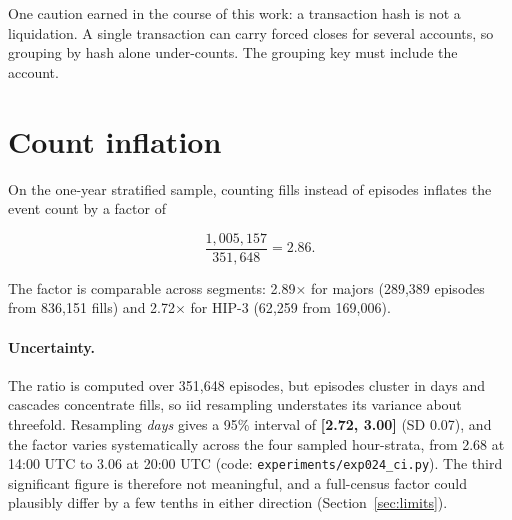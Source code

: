\documentclass[11pt,a4paper]{article}
\begin{document}
One caution earned in the course of this work: a transaction hash is not a liquidation. A single
transaction can carry forced closes for several accounts, so grouping by hash alone
under-counts. The grouping key must include the account.

\section{Count inflation}
\label{sec:count}

On the one-year stratified sample, counting fills instead of episodes inflates the event count
by a factor of

\[
\frac{1{,}005{,}157}{351{,}648} = \mathbf{2.86}.
\]

The factor is comparable across segments: 2.89$\times$ for majors (289{,}389 episodes from
836{,}151 fills) and 2.72$\times$ for HIP-3 (62{,}259 from 169{,}006).

\paragraph{Uncertainty.} The ratio is computed over 351{,}648 episodes, but episodes cluster in
days and cascades concentrate fills, so iid resampling understates its variance about
threefold. Resampling \emph{days} gives a 95\% interval of \textbf{[2.72, 3.00]} (SD 0.07),
and the factor varies systematically across the four sampled hour-strata, from 2.68 at 14:00
UTC to 3.06 at 20:00 UTC (code: \texttt{experiments/exp024\_ci.py}). The third significant
figure is therefore not meaningful, and a full-census factor could plausibly differ by a few
tenths in either direction (Section~\ref{sec:limits}).
\end{document}
